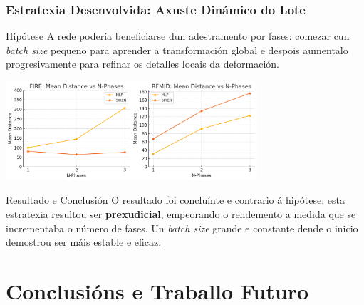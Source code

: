\documentclass[xcolor=dvipsnames]{beamer}
\begin{document}
\begin{frame}
    \frametitle{Estratexia Desenvolvida: Axuste Dinámico do Lote}
    
    \begin{block}{Hipótese}
        A rede podería beneficiarse dun adestramento por fases: comezar cun \textit{batch size} pequeno para aprender a transformación global e despois aumentalo progresivamente para refinar os detalles locais da deformación.
    \end{block}
    
    \centering
    \includegraphics[width=0.7\textwidth]{../imaxes/lottery/nphases.png}
    
    \begin{alertblock}{Resultado e Conclusión}
        O resultado foi concluínte e contrario á hipótese: esta estratexia resultou ser \textbf{prexudicial}, empeorando o rendemento a medida que se incrementaba o número de fases. Un \textit{batch size} grande e constante dende o inicio demostrou ser máis estable e eficaz.
    \end{alertblock}

\end{frame}

\section{Conclusións e Traballo Futuro}
\end{document}
